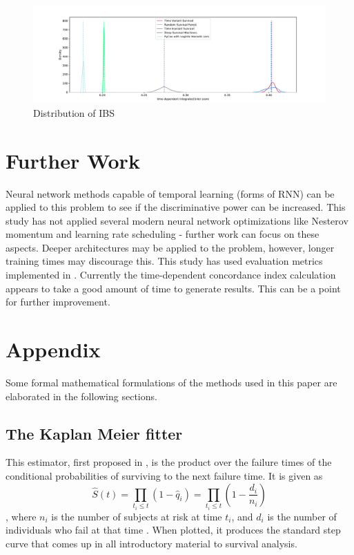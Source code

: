 \documentclass[%
 reprint,
 amsmath,amssymb,
 aps,nofootinbib
]{revtex4-2}
\begin{document}
\begin{figure}[t]
  \centering
  \includegraphics[width=\textwidth]{ibs_score_dist_plot.pdf}
  \caption{Distribution of IBS}
  \label{fig:ibs}
\end{figure}

\section{\label{morework}Further Work}
Neural network methods capable of temporal learning (forms of RNN) can be applied to this problem to see if the discriminative power can be increased. This study has not applied several modern neural network optimizations like Nesterov momentum and learning rate scheduling - further work can focus on these aspects. Deeper architectures may be applied to the problem, however, longer training times may discourage this. This study has used evaluation metrics implemented in \cite{kvamme_continuous_2019}. Currently the time-dependent concordance index calculation appears to take a good amount of time to generate results. This can be a point for further improvement.

\cite{*}


\appendix

\section{\label{appdx}Appendix}

Some formal mathematical formulations of the methods used in this paper are elaborated in the following sections.\\

\subsection{\label{non_param}The Kaplan Meier fitter}

This estimator, first proposed in \cite{km_curve}, is the product over the failure times of the conditional probabilities of surviving to the next failure time. It is given as
\[
\hat{S}(t) = \prod_{t_i \le t}(1 - \hat{q}_i) = \prod_{t_i \le t}(1 - \frac{d_i}{n_i})
\],
where $n_i$ is the number of subjects at risk at time $t_i$, and $d_i$ is the number of individuals who fail at that time \cite{Moore_2016}. When plotted, it produces the standard step curve that comes up in all introductory material to survival analysis.
\end{document}
